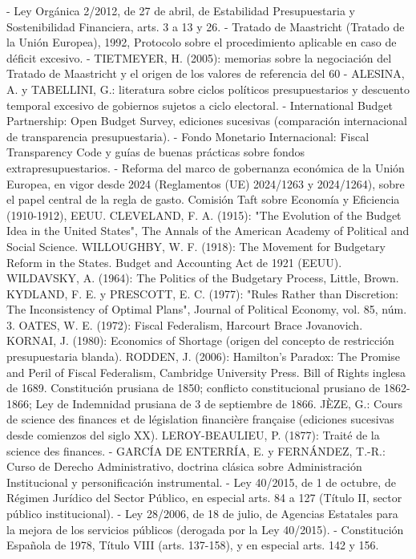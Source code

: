 \documentclass[10pt,a4paper]{article}
\begin{document}
- Ley Orgánica 2/2012, de 27 de abril, de Estabilidad Presupuestaria y Sostenibilidad Financiera, arts. 3 a 13 y 26.
- Tratado de Maastricht (Tratado de la Unión Europea), 1992, Protocolo sobre el procedimiento aplicable en caso de déficit excesivo.
- TIETMEYER, H. (2005): memorias sobre la negociación del Tratado de Maastricht y el origen de los valores de referencia del 60%
- ALESINA, A. y TABELLINI, G.: literatura sobre ciclos políticos presupuestarios y descuento temporal excesivo de gobiernos sujetos a ciclo electoral.
- International Budget Partnership: Open Budget Survey, ediciones sucesivas (comparación internacional de transparencia presupuestaria).
- Fondo Monetario Internacional: Fiscal Transparency Code y guías de buenas prácticas sobre fondos extrapresupuestarios.
- Reforma del marco de gobernanza económica de la Unión Europea, en vigor desde 2024 (Reglamentos (UE) 2024/1263 y 2024/1264), sobre el papel central de la regla de gasto.
Comisión Taft sobre Economía y Eficiencia (1910-1912), EEUU.
CLEVELAND, F. A. (1915): "The Evolution of the Budget Idea in the United States", The Annals of the American Academy of Political and Social Science.
WILLOUGHBY, W. F. (1918): The Movement for Budgetary Reform in the States.
Budget and Accounting Act de 1921 (EEUU).
WILDAVSKY, A. (1964): The Politics of the Budgetary Process, Little, Brown.
KYDLAND, F. E. y PRESCOTT, E. C. (1977): "Rules Rather than Discretion: The Inconsistency of Optimal Plans", Journal of Political Economy, vol. 85, núm. 3.
OATES, W. E. (1972): Fiscal Federalism, Harcourt Brace Jovanovich.
KORNAI, J. (1980): Economics of Shortage (origen del concepto de restricción presupuestaria blanda).
RODDEN, J. (2006): Hamilton's Paradox: The Promise and Peril of Fiscal Federalism, Cambridge University Press.
Bill of Rights inglesa de 1689.
Constitución prusiana de 1850; conflicto constitucional prusiano de 1862-1866; Ley de Indemnidad prusiana de 3 de septiembre de 1866.
JÈZE, G.: Cours de science des finances et de législation financière française (ediciones sucesivas desde comienzos del siglo XX).
LEROY-BEAULIEU, P. (1877): Traité de la science des finances.
- GARCÍA DE ENTERRÍA, E. y FERNÁNDEZ, T.-R.: Curso de Derecho Administrativo, doctrina clásica sobre Administración Institucional y personificación instrumental.
- Ley 40/2015, de 1 de octubre, de Régimen Jurídico del Sector Público, en especial arts. 84 a 127 (Título II, sector público institucional).
- Ley 28/2006, de 18 de julio, de Agencias Estatales para la mejora de los servicios públicos (derogada por la Ley 40/2015).
- Constitución Española de 1978, Título VIII (arts. 137-158), y en especial arts. 142 y 156.
\end{document}
